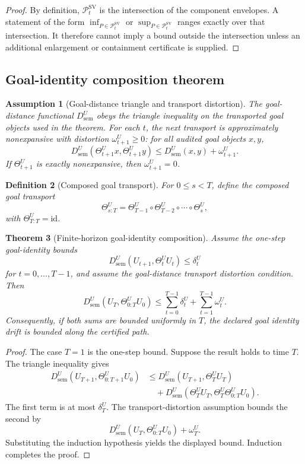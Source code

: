 \documentclass[11pt]{article}
\newtheorem{theorem}{Theorem}[section]
\newtheorem{definition}[theorem]{Definition}
\newtheorem{assumption}[theorem]{Assumption}
\newcommand{\Pcal}{\mathcal{P}}
\newcommand{\id}{\mathrm{id}}
\newcommand{\1}{\mathbf{1}}
\providecommand{\sem}{\mathrm{sem}}
\begin{document}
\begin{proof}
By definition, \(\Pcal_t^{\mathrm{SV}}\) is the intersection of the component envelopes.  A statement of the form \(\inf_{P\in\Pcal_t^{\mathrm{SV}}}\) or \(\sup_{P\in\Pcal_t^{\mathrm{SV}}}\) ranges exactly over that intersection.  It therefore cannot imply a bound outside the intersection unless an additional enlargement or containment certificate is supplied.
\end{proof}

\subsection{Goal-identity composition theorem}

\begin{assumption}[Goal-distance triangle and transport distortion]
\label{ass:batch12a_goal_distance_transport_distortion}
The goal-distance functional \(D_{\sem}^U\) obeys the triangle inequality on the transported goal objects used in the theorem.  For each \(t\), the next transport is approximately nonexpansive with distortion \(\omega_{t+1}^U\ge0\): for all audited goal objects \(x,y\),
\[
D_{\sem}^U(\Theta_{t+1}^Ux,\Theta_{t+1}^Uy)
\le
D_{\sem}^U(x,y)+\omega_{t+1}^U.
\]
If \(\Theta_{t+1}^U\) is exactly nonexpansive, then \(\omega_{t+1}^U=0\).
\end{assumption}

\begin{definition}[Composed goal transport]
\label{def:batch12a_composed_goal_transport}
For \(0\le s<T\), define the composed goal transport
\[
\Theta_{s:T}^U
=
\Theta_{T-1}^U\circ\Theta_{T-2}^U\circ\cdots\circ\Theta_s^U,
\]
with \(\Theta_{T:T}^U=\id\).
\end{definition}

\begin{theorem}[Finite-horizon goal-identity composition]
\label{thm:batch12a_goal_identity_composition}
Assume the one-step goal-identity bounds
\[
D_{\sem}^U(U_{t+1},\Theta_t^UU_t)\le\delta_t^U
\]
for \(t=0,\ldots,T-1\), and assume the goal-distance transport distortion condition.  Then
\[
D_{\sem}^U(U_T,\Theta_{0:T}^U U_0)
\le
\sum_{t=0}^{T-1}\delta_t^U
+
\sum_{t=1}^{T-1}\omega_t^U.
\]
Consequently, if both sums are bounded uniformly in \(T\), the declared goal identity drift is bounded along the certified path.
\end{theorem}

\begin{proof}
The case \(T=1\) is the one-step bound.  Suppose the result holds to time \(T\).  The triangle inequality gives
\[
\begin{aligned}
D_{\sem}^U(U_{T+1},\Theta_{0:T+1}^U U_0)
&\le
D_{\sem}^U(U_{T+1},\Theta_T^U U_T)\\
&\quad+
D_{\sem}^U(\Theta_T^U U_T,\Theta_T^U\Theta_{0:T}^U U_0).
\end{aligned}
\]
The first term is at most \(\delta_T^U\).  The transport-distortion assumption bounds the second by
\[
D_{\sem}^U(U_T,\Theta_{0:T}^UU_0)+\omega_T^U.
\]
Substituting the induction hypothesis yields the displayed bound.  Induction completes the proof.
\end{proof}
\end{document}
